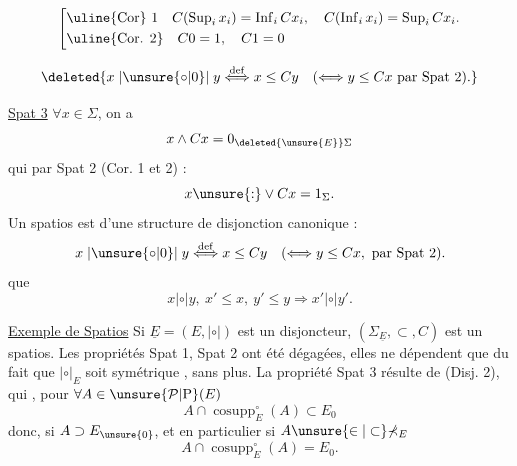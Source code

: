 \[
\left[\begin{aligned}
&\text{\uline{Cor} 1}\quad C(\operatorname{Sup}_{i}x_{i})=\operatorname{Inf}_{i}Cx_{i},\quad C(\operatorname{Inf}_{i}x_{i})=\operatorname{Sup}_{i}Cx_{i}.\\
&\text{\uline{Cor. 2}}\quad C0=1,\quad C1=0
\end{aligned}\right.
\]

\[
\deleted{x\mathrel{|\unsure{\circ|0}|}y\mathrel{\overset{\mathrm{def}}{\Longleftrightarrow}}x\leq Cy\quad(\Longleftrightarrow y\leq Cx\ \text{par Spat 2}).}
\]

\uline{Spat 3} $\forall x\in\Sigma$, on a
\[
x\wedge Cx=0_{\deleted{\unsure{E}}\Sigma}
\]
 qui  par Spat 2 (Cor. 1 et 2) :
\[
x\unsure{:}\vee Cx=1_{\Sigma}.
\]
 Un spatios est   d'une structure de disjonction canonique :
\[
x\mathrel{|\unsure{\circ|0}|}y\mathrel{\overset{\mathrm{def}}{\Longleftrightarrow}}x\leq Cy\quad(\Longleftrightarrow y\leq Cx,\ \text{par Spat 2}).
\]
 que
\[
x\mathrel{|\circ|}y,\ x'\leq x,\ y'\leq y\Longrightarrow x'\mathrel{|\circ|}y'.
\]



 \uline{Exemple de Spatios} Si $\underline{E}=(E,\mathrel{|\circ|})$ est un disjoncteur, $(\mathbb{\Sigma}_{\underline{E}},\subset,C)$ est un spatios. Les  propriétés Spat 1, Spat 2 ont été dégagées, elles ne dépendent que du fait que $\mathrel{|\circ|}_{E}$ soit symétrique , sans plus. La propriété Spat 3 résulte de (Disj. 2), qui , pour $\forall A\in\unsure{\mathcal{P}|\mathrm{P}}(E)$
\[
A\cap\operatorname{cosupp}_{E}^{\circ}(A)\subset E_{0}
\]
donc, si $A\supset E_{\unsure{0}}$, et en particulier si $A\unsure{\in|\subset}\mathbb{\Sigma}_{E}$
\[
A\cap\operatorname{cosupp}_{E}^{\circ}(A)=E_{0}.
\]

